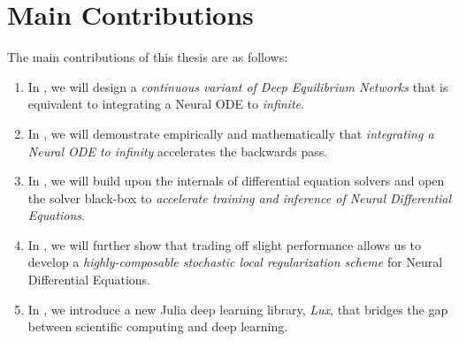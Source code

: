 \section{Main Contributions}

The main contributions of this thesis are as follows:
%
\begin{enumerate}
  \item In , we will design a \textit{continuous variant of Deep Equilibrium Networks} that is equivalent to integrating a Neural ODE to \textit{infinite}.
  \item In , we will demonstrate empirically and mathematically that \textit{integrating a Neural ODE to infinity} accelerates the backwards pass.
  \item In , we will build upon the internals of differential equation solvers and open the solver black-box to \textit{accelerate training and inference of Neural Differential Equations}.
  \item In , we will further show that trading off slight performance allows us to develop a \textit{highly-composable stochastic local regularization scheme} for Neural Differential Equations.
  \item In , we introduce a new Julia deep learning library, \textit{Lux}, that bridges the gap between scientific computing and deep learning.
\end{enumerate}
